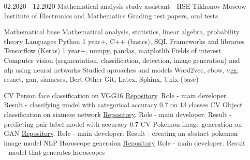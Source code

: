 \documentclass[9pt]{developercv} %
\begin{document}
	
	
	
	\begin{entrylist}
		\entry
		{02.2020 - 12.2020}
		{Mathematical analysis study assistant - HSE Tikhonov Moscow Institute of Electronics and Mathematics}
		{ }
		{Grading test papers, oral tests }
	\end{entrylist}
	
	
	\cvsect{Skills}
	
	\begin{entrylist}
		\entry
		{ }
		{Mathematical base}
		{ }
		{Mathematical analysis, statistics, linear algebra, probability theory    }
		\entry
		{ }
		{Languages }
		{ }
		{Python 1 year+, C++ (basics), SQL }
		\entry
		{ }
		{Frameworks and libraries}
		{ }
		{Tensorflow (Keras) 1 year+, numpy, pandas, matplotlib }
		\entry
		{ }
		{Fields of interest}
		{ }
		{Computer vision (segmentation, classification, detection, image generation) and  nlp using neural networks  }
		\entry
		{ }
		{Studied aproaches and models}
		{ }
		{Word2vec, cbow, vgg, resnet, gan, siameses, Bert    }
		\entry
		{ }
		{Other}
		{ }
		{Git, Latex, Sphinx, Unix (base) }
	\end{entrylist}

	\cvsect{Projects}
	
	\begin{entrylist}
		\entry
		{CV }
		{Person face classification on VGG16}
		{ }
		{\href{https://github.com/ArmageddonReloadedDK/face_net}{Repository}. Role - main developer. Result - classifying model with categorical accuracy 0.7 on 13 classes }
		\entry
		{CV }
		{Object classification on siamese network}
		{ }
		{\href{https://github.com/ArmageddonReloadedDK/siamese_net}{Repository}. Role - main developer. Result - predicting pair label model with accuracy 0.7 }
		\entry
		{CV}
		{Pokemon image generation on GAN}
		{}
		{\href{https://github.com/ArmageddonReloadedDK/piko_gan}{Repository}.  Role - main developer. Result - creating an abstact
		 pokemon image model }
		\entry
		{NLP}
		{Horoscope generaion}
		{ }
		{\href{https://github.com/ArmageddonReloadedDK/astro}{Repository} Role - main developer. Result - model that generates horoscopes  }
	
	\end{entrylist}
	
\end{document}
